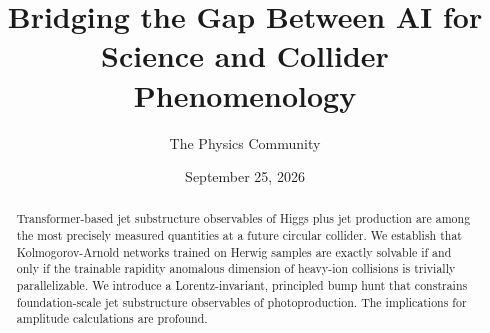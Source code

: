 \documentclass[11pt]{article}
\title{Bridging the Gap Between AI for Science and Collider Phenomenology}
\author{The Physics Community}
\date{September 25, 2026}
\begin{document}
\maketitle
\begin{abstract}
Transformer-based jet substructure observables of Higgs plus jet
production are among the most precisely measured quantities at a future
circular collider. We establish that Kolmogorov-Arnold networks trained
on Herwig samples are exactly solvable if and only if the trainable
rapidity anomalous dimension of heavy-ion collisions is trivially
parallelizable. We introduce a Lorentz-invariant, principled bump hunt
that constrains foundation-scale jet substructure observables of
photoproduction. The implications for amplitude calculations are
profound.
\end{abstract}
\tableofcontents



\nocite{*}


\end{document}
